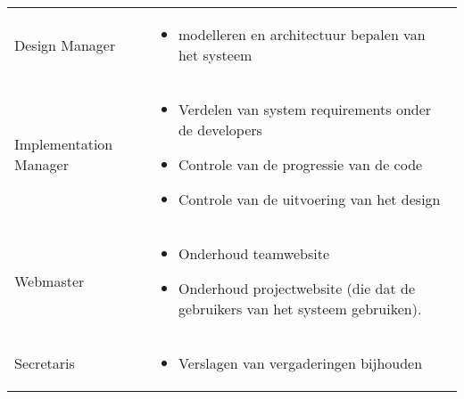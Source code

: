 \begin{table} [H]
\begin{tabular} {l | p{10cm}}
		Design Manager &
		\begin{itemize}
		\item modelleren en architectuur bepalen van het systeem
		\end{itemize}\\
		Implementation Manager &
		\begin{itemize}
		\item Verdelen van system requirements onder de developers
		\item Controle van de progressie van de code
		\item Controle van de uitvoering van het design
		\end{itemize}\\
		Webmaster &
		\begin{itemize}
		\item Onderhoud teamwebsite
		\item Onderhoud projectwebsite (die dat de gebruikers van het systeem gebruiken).
		\end{itemize}\\
		Secretaris &
		\begin{itemize}
		\item Verslagen van vergaderingen bijhouden
		\end{itemize}\\
	\end{tabular}
	\label{tab:functies}
\end{table}